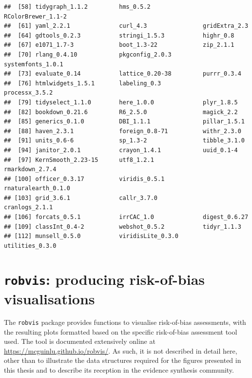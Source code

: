 \documentclass[a4paper, twoside]{templates/ociamthesis}
\begin{document}
\begin{verbatim}
##  [58] tidygraph_1.1.2         hms_0.5.2               RColorBrewer_1.1-2     
##  [61] yaml_2.2.1              curl_4.3                gridExtra_2.3          
##  [64] gdtools_0.2.3           stringi_1.5.3           highr_0.8              
##  [67] e1071_1.7-3             boot_1.3-22             zip_2.1.1              
##  [70] rlang_0.4.10            pkgconfig_2.0.3         systemfonts_1.0.1      
##  [73] evaluate_0.14           lattice_0.20-38         purrr_0.3.4            
##  [76] htmlwidgets_1.5.1       labeling_0.3            processx_3.5.2         
##  [79] tidyselect_1.1.0        here_1.0.0              plyr_1.8.5             
##  [82] bookdown_0.21.6         R6_2.5.0                magick_2.2             
##  [85] generics_0.1.0          DBI_1.1.1               pillar_1.5.1           
##  [88] haven_2.3.1             foreign_0.8-71          withr_2.3.0            
##  [91] units_0.6-6             sp_1.3-2                tibble_3.1.0           
##  [94] janitor_2.0.1           crayon_1.4.1            uuid_0.1-4             
##  [97] KernSmooth_2.23-15      utf8_1.2.1              rmarkdown_2.7.4        
## [100] officer_0.3.17          viridis_0.5.1           rnaturalearth_0.1.0    
## [103] grid_3.6.1              callr_3.7.0             cranlogs_2.1.1         
## [106] forcats_0.5.1           irrCAC_1.0              digest_0.6.27          
## [109] classInt_0.4-2          webshot_0.5.2           tidyr_1.1.3            
## [112] munsell_0.5.0           viridisLite_0.3.0       utilities_0.3.0
\end{verbatim}

\newpage

\hypertarget{appendix-robvis}{%
\section{\texorpdfstring{\texttt{robvis}: producing risk-of-bias visualisations}{robvis: producing risk-of-bias visualisations}}\label{appendix-robvis}}

The \texttt{robvis} package provides functions to visualise risk-of-bias assessments, with the resulting plots formatted based on the specific risk-of-bias assessment tool used. The tool is documented extensively online at \url{https://mcguinlu.github.io/robvis/}. As such, it is not described in detail here, other than to illustrate the data structures required for the figures presented in this thesis and to describe its reception in the evidence synthesis community.

~
\end{document}
